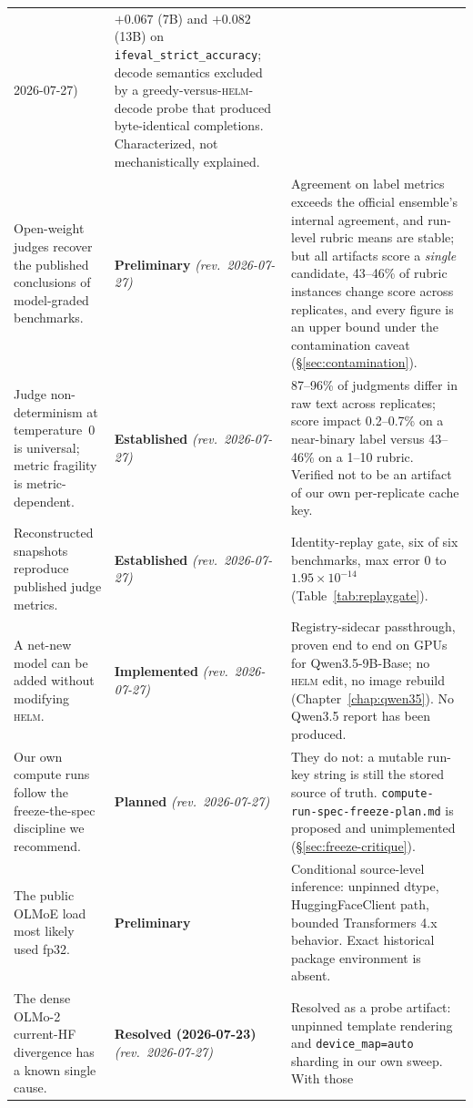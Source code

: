 \documentclass[11pt]{report}
\newcommand{\code}[1]{\texttt{#1}}
\newcommand{\file}[1]{\texttt{#1}}
\newcommand{\statusEstablished}{\textbf{Established}}
\newcommand{\statusImplemented}{\textbf{Implemented}}
\newcommand{\statusPreliminary}{\textbf{Preliminary}}
\newcommand{\statusPlanned}{\textbf{Planned}}
\newcommand{\statusResolved}{\textbf{Resolved (2026-07-23)}}
\begin{document}
\begin{longtable}{@{}p{}p{}p{}@{}}
{2026-07-27)} & $+0.067$ (7B) and $+0.082$ (13B) on \code{ifeval\_strict\_accuracy};
decode semantics excluded by a greedy-versus-\textsc{helm}-decode probe that produced
byte-identical completions. Characterized, not mechanistically explained. \\
Open-weight judges recover the published conclusions of model-graded benchmarks. &
\statusPreliminary{} \emph{(rev.\ 2026-07-27)} & Agreement on label metrics exceeds
the official ensemble's internal agreement, and run-level rubric means are stable;
but all artifacts score a \emph{single} candidate, 43--46\% of rubric instances
change score across replicates, and every figure is an upper bound under the
contamination caveat (\S\ref{sec:contamination}). \\
Judge non-determinism at temperature~0 is universal; metric fragility is
metric-dependent. & \statusEstablished{} \emph{(rev.\ 2026-07-27)} & 87--96\% of
judgments differ in raw text across replicates; score impact 0.2--0.7\% on a
near-binary label versus 43--46\% on a 1--10 rubric. Verified not to be an artifact
of our own per-replicate cache key. \\
Reconstructed snapshots reproduce published judge metrics. & \statusEstablished{}
\emph{(rev.\ 2026-07-27)} & Identity-replay gate, six of six benchmarks, max error
$0$ to $1.95\times10^{-14}$ (Table~\ref{tab:replaygate}). \\
A net-new model can be added without modifying \textsc{helm}. & \statusImplemented{}
\emph{(rev.\ 2026-07-27)} & Registry-sidecar passthrough, proven end to end on GPUs
for Qwen3.5-9B-Base; no \textsc{helm} edit, no image rebuild
(Chapter~\ref{chap:qwen35}). No Qwen3.5 report has been produced. \\
Our own compute runs follow the freeze-the-spec discipline we recommend. &
\statusPlanned{} \emph{(rev.\ 2026-07-27)} & They do not: a mutable run-key string
is still the stored source of truth. \file{compute-run-spec-freeze-plan.md} is
proposed and unimplemented (\S\ref{sec:freeze-critique}). \\
The public OLMoE load most likely used fp32. & \statusPreliminary & Conditional
source-level inference: unpinned dtype, HuggingFaceClient path, bounded Transformers
4.x behavior. Exact historical package environment is absent. \\
The dense OLMo-2 current-HF divergence has a known single cause. &
\statusResolved{} \emph{(rev.\ 2026-07-27)} & Resolved as a probe artifact: unpinned
template rendering and \code{device\_map=auto} sharding in our own sweep. With those

\end{longtable}
\end{document}
